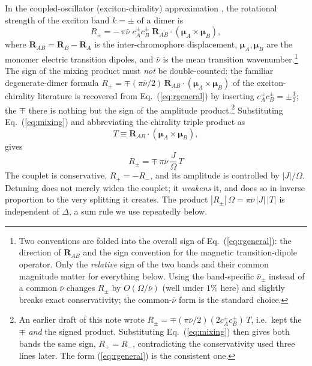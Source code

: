 \documentclass[11pt,a4paper]{article}
\newcommand{\muv}{\bm{\mu}}
\newcommand{\Rv}{\mathbf{R}}
\begin{document}
In the coupled-oscillator (exciton-chirality) approximation
\cite{tinoco1962,schellman1975,harada1983,berova2007}, the rotational
strength of the exciton band $k=\pm$ of a dimer is
\begin{equation}
R_{\pm} = -\,\pi\bar\nu\;
c^{\pm}_{A}c^{\pm}_{B}\;
\Rv_{AB}\cdot(\muv_{A}\times\muv_{B}),
\label{eq:rgeneral}
\end{equation}
where $\Rv_{AB}=\Rv_{B}-\Rv_{A}$ is the inter-chromophore displacement,
$\muv_{A},\muv_{B}$ are the monomer electric transition dipoles, and $\bar\nu$
is the mean transition wavenumber.\footnote{Two conventions are folded into the
overall sign of Eq.~(\ref{eq:rgeneral}): the direction of $\Rv_{AB}$ and the
sign convention for the magnetic transition-dipole operator. Only the
\emph{relative} sign of the two bands and their common magnitude matter for
everything below. Using the band-specific $\bar\nu_{\pm}$ instead of a common
$\bar\nu$ changes $R_{\pm}$ by $O(\Omega/\bar\nu)$ (well under $1\%$ here) and
slightly breaks exact conservativity; the common-$\bar\nu$ form is the standard
choice.} The sign of the mixing product must \emph{not} be double-counted: the
familiar degenerate-dimer formula
$R_{\pm}=\mp(\pi\bar\nu/2)\,\Rv_{AB}\cdot(\muv_{A}\times\muv_{B})$ of the
exciton-chirality literature \cite{harada1983,berova2007} is recovered from
Eq.~(\ref{eq:rgeneral}) by inserting $c^{\pm}_{A}c^{\pm}_{B}=\pm\tfrac12$; the
$\mp$ there is nothing but the sign of the amplitude product.\footnote{An
earlier draft of this note wrote
$R_{\pm}=\mp(\pi\bar\nu/2)(2c^{\pm}_{A}c^{\pm}_{B})\,T$, i.e.\ kept the $\mp$
\emph{and} the signed product. Substituting Eq.~(\ref{eq:mixing}) then gives
both bands the same sign, $R_{+}=R_{-}$, contradicting the conservativity used
three lines later. The form (\ref{eq:rgeneral}) is the consistent one.}
Substituting Eq.~(\ref{eq:mixing}) and abbreviating the chirality triple
product as
\begin{equation}
T \equiv \Rv_{AB}\cdot(\muv_{A}\times\muv_{B}),
\end{equation}
gives
\begin{equation}
\boxed{\;
R_{\pm} = \mp\,\pi\bar\nu\,\frac{J}{\Omega}\,T \;}
\label{eq:rotational}
\end{equation}
The couplet is conservative, $R_{+}=-R_{-}$, and its amplitude is controlled by
$|J|/\Omega$. Detuning does not merely widen the couplet; it \emph{weakens} it,
and does so in inverse proportion to the very splitting it creates. The product
$|R_{\pm}|\,\Omega=\pi\bar\nu\,|J|\,|T|$ is independent of $\Delta$, a sum rule
we use repeatedly below.
\end{document}
